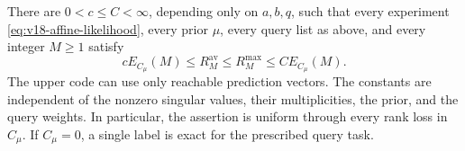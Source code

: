 \begin{theorem}
\label{thm:v18-affine-classification}
There are $0<c\le C<\infty$, depending only on $a,b,q$, such that every
experiment \eqref{eq:v18-affine-likelihood}, every prior $\mu$, every
query list as above, and every integer $M\ge1$ satisfy
\begin{equation}\label{eq:v18-affine-law}
 cE_{C_\mu}(M)\le R^{\mathrm{av}}_M
 \le R^{\mathrm{max}}_M\le CE_{C_\mu}(M).
\end{equation}
The upper code can use only reachable prediction vectors. The constants
are independent of the nonzero singular values, their multiplicities,
the prior, and the query weights. In particular, the assertion is
uniform through every rank loss in $C_\mu$. If $C_\mu=0$, a single
label is exact for the prescribed query task.
\end{theorem}

